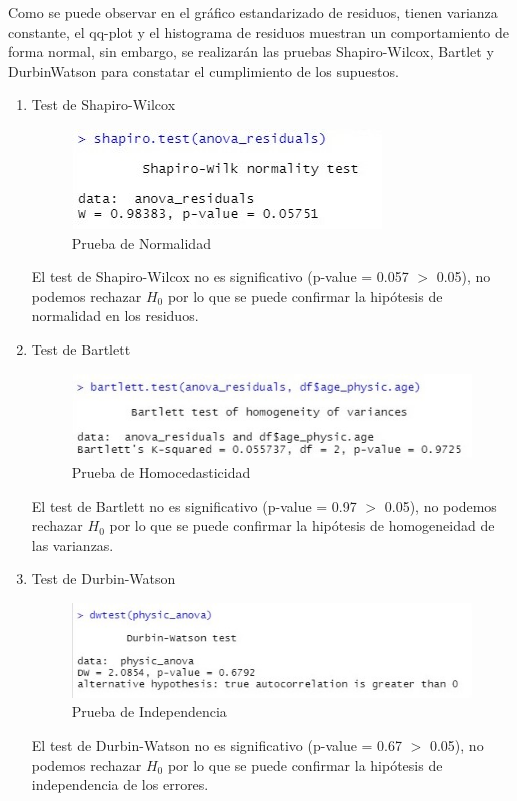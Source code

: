 \documentclass[a4paper,10pt,twocolumn]{article}
\begin{document}
Como se puede observar en el gráfico estandarizado de residuos, tienen varianza constante, el qq-plot y el histograma de residuos
muestran un comportamiento de forma normal, sin embargo, se realizarán las pruebas Shapiro-Wilcox, Bartlet y DurbinWatson para constatar el cumplimiento de los supuestos.

\begin{enumerate}
	\item Test de Shapiro-Wilcox
	
	\begin{figure}[h]
		\includegraphics[scale=0.7]{./imgs/anova_shapiro.jpg}
		\caption{Prueba de Normalidad}
	\end{figure}
	
	El test de Shapiro-Wilcox no es significativo (p-value = 0.057 $>$ 0.05), no podemos rechazar $H_{0}$ por lo que se puede confirmar la hipótesis de normalidad en los residuos.
	
	\item Test de Bartlett
	
	\begin{figure}[h]
		\includegraphics[scale=0.65]{./imgs/anova_bartlett.jpg}
		\caption{Prueba de Homocedasticidad}
	\end{figure}
	
	El test de Bartlett no es significativo (p-value = 0.97 $>$ 0.05), no podemos rechazar $H_{0}$ por lo que se puede confirmar la hipótesis de homogeneidad de las varianzas.
	
	\item Test de Durbin-Watson
	
	\begin{figure}[h]
		\includegraphics[scale=0.63]{./imgs/anova_dw.jpg}
		\caption{Prueba de Independencia}
	\end{figure}
	
	El test de Durbin-Watson no es significativo (p-value = 0.67 $>$ 0.05), no podemos rechazar $H_{0}$ por lo que se puede confirmar la hipótesis de independencia de los errores.
	
\end{enumerate}
\end{document}
